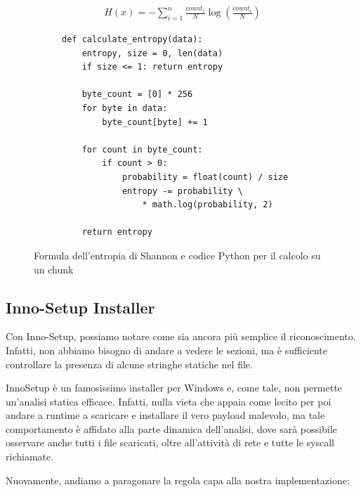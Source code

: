 \begin{figure}[htbp]
    \begin{subfigure}[t]{0,48\textwidth}
        \begin{gather*}
            H(x) = - \sum_{i=1}^{n} \frac{count_i}{N} \log{\left(\frac{count_i}{N}\right)}
        \end{gather*}
    \end{subfigure}
    \begin{subfigure}[t]{0,48\textwidth}
        \begin{verbatim}
def calculate_entropy(data):
    entropy, size = 0, len(data)
    if size <= 1: return entropy

    byte_count = [0] * 256
    for byte in data:
        byte_count[byte] += 1

    for count in byte_count:
        if count > 0:
            probability = float(count) / size
            entropy -= probability \
                * math.log(probability, 2)

    return entropy
        \end{verbatim}
    \end{subfigure}
    \caption{Formula dell'entropia di Shannon e codice Python per il calcolo su un chunk}
    \label{fig:shannon_entropy_formula}
\end{figure}


\subsection{Inno-Setup Installer}
Con Inno-Setup, possiamo notare come sia ancora più semplice il riconoscimento. Infatti, non abbiamo bisogno di andare a vedere le sezioni, ma è sufficiente controllare la presenza di alcune stringhe statiche nel file.

InnoSetup è un famosissimo installer per Windows e, come tale, non permette un'analisi statica
efficace. Infatti, nulla vieta che appaia come lecito per poi andare a runtime a scaricare e installare il vero payload malevolo, ma tale comportamento è affidato alla parte dinamica dell'analisi, dove sarà possibile osservare anche tutti i file scaricati, oltre all'attività di rete e tutte le syscall richiamate.

Nuovamente, andiamo a paragonare la regola capa alla nostra implementazione:


